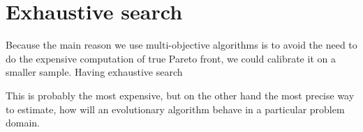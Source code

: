 \documentclass[12pt,oneside]{fithesis2}
\begin{document}
\section{Exhaustive search}
Because the main reason we use multi-objective algorithms is to avoid the need to do the expensive computation of true Pareto front, we could calibrate it on a smaller sample. Having exhaustive search

This is probably the most expensive, but on the other hand the most precise way to estimate, how will an evolutionary algorithm behave in a particular problem domain.



\end{document}
